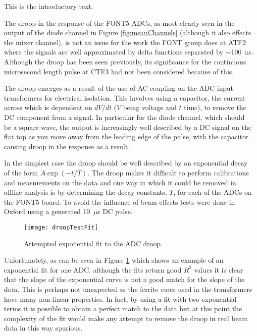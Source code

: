 
This is the introductory text.



The droop in the response of the FONT5 ADCs, as most clearly seen in the output of the diode channel in Figure \ref{fig:meanChannels} (although it also effects the mixer channel), is not an issue for the work the FONT group does at ATF2 where the signals are well approximated by delta functions separated by \(\sim\)100~ns. Although the droop has been seen previously, its significance for the continuous microsecond length pulse at CTF3 had not been considered because of this.

The droop emerges as a result of the use of AC coupling on the ADC input transformers for electrical isolation. This involves using a capacitor, the current across which is dependent on \({dV}/{dt}\) (\(V\) being voltage and \(t\) time), to remove the DC component from a signal. In particular for the diode channel, which should be a square wave, the output is increasingly well described by a DC signal on the flat top as you move away from the leading edge of the pulse, with the capacitor causing droop in the response as a result.

In the simplest case the droop should be well described by an exponential decay of the form \(A\exp\left(-t/T\right)\). The droop makes it difficult to perform calibrations and measurements on the data and one way in which it could be removed in offline analysis is by determining the decay constants, \(T\), for each of the ADCs on the FONT5 board. To avoid the influence of beam effects tests were done in Oxford using a generated 10~\(\mu\)s DC pulse.

\vspace{-0.4cm}
\begin{figure}[h]
  \centering
  \texttt{[image: droopTestFit]}
  \caption{\small Attempted exponential fit to the ADC droop.}
  \label{fig:droopTestFit}
\end{figure}

Unfortunately, as can be seen in Figure \ref{fig:droopTestFit} which shows an example of an exponential fit for one ADC, although the fits return good \(R^{2}\) values it is clear that the slope of the exponential curve is not a good match for the slope of the data. This is perhaps not unexpected as the ferrite cores used in the transformers have many non-linear properties. In fact, by using a fit with two exponential terms it is possible to obtain a perfect match to the data but at this point the complexity of the fit would make any attempt to remove the droop in real beam data in this way spurious.

